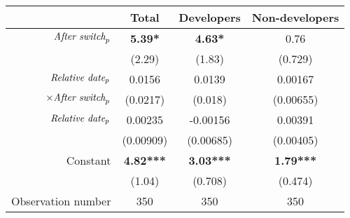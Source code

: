\begin{tabular}{|r|c|c|c|}
\hline
&  Total & Developers & Non-developers \\
\hline
$\mbox{\emph{After switch}}_p$ & \textbf{5.39*} & \textbf{4.63*} & 0.76 \\
 & (2.29) & (1.83) & (0.729) \\
\hline
$\mbox{\emph{Relative date}}_p$ & 0.0156 & 0.0139 & 0.00167 \\
$\times \mbox{\emph{After switch}}_p$ & (0.0217) & (0.018) & (0.00655) \\
\hline
$\mbox{\emph{Relative date}}_p$ & 0.00235 & -0.00156 & 0.00391 \\
 & (0.00909) & (0.00685) & (0.00405) \\
\hline
Constant & \textbf{4.82***} & \textbf{3.03***} & \textbf{1.79***} \\
 & (1.04) & (0.708) & (0.474) \\
\hline
Observation number & 350 & 350 & 350 \\
\hline
\end{tabular}